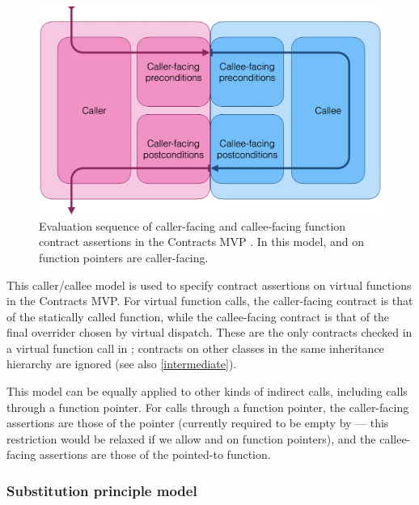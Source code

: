 \begin{figure}[b]
\begin{center}
\includegraphics[scale=0.29]{images/D2900R9-callercallee}
\end{center}
\caption{Evaluation sequence of caller-facing and callee-facing function contract assertions in the Contracts MVP \cite{P2900R8}. In this model,  and  on function pointers are caller-facing.}
\label{fig:callercallee}
\end{figure}

This caller/callee model is used to specify contract assertions on virtual functions in the Contracts MVP. For virtual function calls, the caller-facing contract is that of the statically called function, while the callee-facing contract is that of the final overrider chosen by virtual dispatch. These are the only contracts checked in a virtual function call in \cite{P2900R8}; contracts on other classes in the same inheritance hierarchy are ignored (see also \ref{intermediate}).

This model can be equally applied to other kinds of indirect calls, including calls through a function pointer. For calls through a function pointer, the caller-facing assertions are those of the pointer (currently required to be empty by \cite{P2900R8} --- this restriction would be relaxed if we allow  and  on function pointers), and the callee-facing assertions are those of the pointed-to function. 

\subsubsection{Substitution principle model}
\label{submodel}

